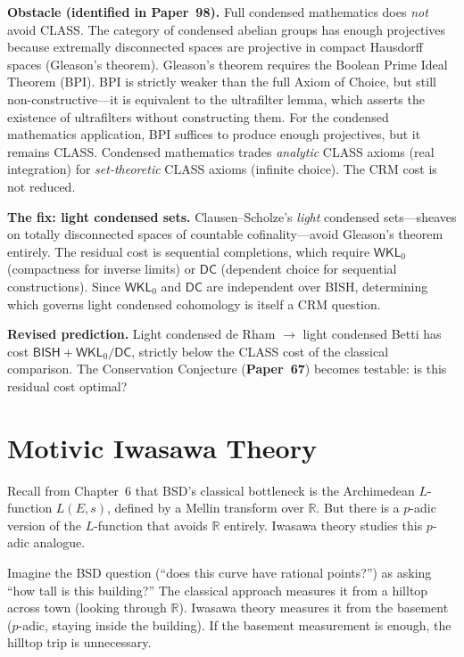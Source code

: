 \documentclass[11pt,twoside,openany]{report}
\theoremstyle{remark}
\newcommand{\BISH}{\textsf{BISH}}
\newcommand{\CLASS}{\textsf{CLASS}}
\newcommand{\paperref}[1]{\textbf{Paper~#1}}
\begin{document}
\textbf{Obstacle (identified in \paperref{98}).} Full condensed mathematics does \emph{not} avoid \CLASS. The category of condensed abelian groups has enough projectives because extremally disconnected spaces are projective in compact Hausdorff spaces (Gleason's theorem). Gleason's theorem requires the Boolean Prime Ideal Theorem (BPI). BPI is strictly weaker than the full Axiom of Choice, but still non-constructive---it is equivalent to the ultrafilter lemma, which asserts the existence of ultrafilters without constructing them. For the condensed mathematics application, BPI suffices to produce enough projectives, but it remains \CLASS. Condensed mathematics trades \emph{analytic} \CLASS{} axioms (real integration) for \emph{set-theoretic} \CLASS{} axioms (infinite choice). The CRM cost is not reduced.

\textbf{The fix: light condensed sets.} Clausen--Scholze's \emph{light} condensed sets---sheaves on totally disconnected spaces of countable cofinality---avoid Gleason's theorem entirely. The residual cost is sequential completions, which require $\textsf{WKL}_0$ (compactness for inverse limits) or $\textsf{DC}$ (dependent choice for sequential constructions). Since $\textsf{WKL}_0$ and $\textsf{DC}$ are independent over \BISH, determining which governs light condensed cohomology is itself a CRM question.

\textbf{Revised prediction.} Light condensed de Rham $\to$ light condensed Betti has cost $\BISH + \textsf{WKL}_0/\textsf{DC}$, strictly below the \CLASS{} cost of the classical comparison. The Conservation Conjecture (\paperref{67}) becomes testable: is this residual cost optimal?


\section{Motivic Iwasawa Theory}

\begin{analogybox}
Recall from Chapter~6 that BSD's classical bottleneck is the Archimedean $L$-function $L(E,s)$, defined by a Mellin transform over $\mathbb{R}$. But there is a $p$-adic version of the $L$-function that avoids $\mathbb{R}$ entirely. Iwasawa theory studies this $p$-adic analogue.

Imagine the BSD question (``does this curve have rational points?'') as asking ``how tall is this building?'' The classical approach measures it from a hilltop across town (looking through $\mathbb{R}$). Iwasawa theory measures it from the basement ($p$-adic, staying inside the building). If the basement measurement is enough, the hilltop trip is unnecessary.
\end{analogybox}
\end{document}
